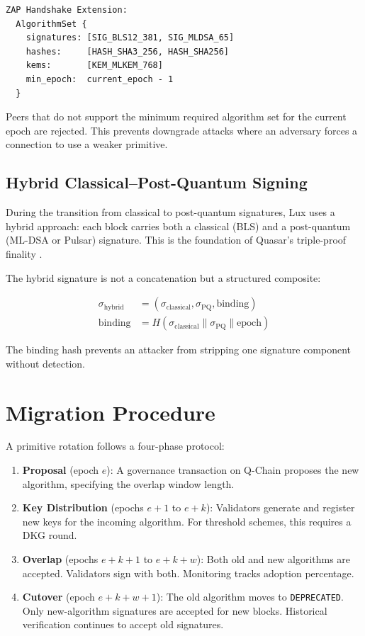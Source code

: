 \documentclass[11pt]{article}
\begin{document}
\begin{verbatim}
ZAP Handshake Extension:
  AlgorithmSet {
    signatures: [SIG_BLS12_381, SIG_MLDSA_65]
    hashes:     [HASH_SHA3_256, HASH_SHA256]
    kems:       [KEM_MLKEM_768]
    min_epoch:  current_epoch - 1
  }
\end{verbatim}

Peers that do not support the minimum required algorithm set for the current epoch are rejected. This prevents downgrade attacks where an adversary forces a connection to use a weaker primitive.

\subsection{Hybrid Classical--Post-Quantum Signing}

During the transition from classical to post-quantum signatures, Lux uses a hybrid approach: each block carries both a classical (BLS) and a post-quantum (ML-DSA or Pulsar) signature. This is the foundation of Quasar's triple-proof finality \cite{quasar}.

The hybrid signature is not a concatenation but a structured composite:

\begin{align}
\sigma_{\text{hybrid}} &= (\sigma_{\text{classical}}, \sigma_{\text{PQ}}, \text{binding}) \\
\text{binding} &= H(\sigma_{\text{classical}} \| \sigma_{\text{PQ}} \| \text{epoch})
\end{align}

The binding hash prevents an attacker from stripping one signature component without detection.

\section{Migration Procedure}

A primitive rotation follows a four-phase protocol:

\begin{enumerate}
\item \textbf{Proposal} (epoch $e$): A governance transaction on Q-Chain proposes the new algorithm, specifying the overlap window length.
\item \textbf{Key Distribution} (epochs $e+1$ to $e+k$): Validators generate and register new keys for the incoming algorithm. For threshold schemes, this requires a DKG round.
\item \textbf{Overlap} (epochs $e+k+1$ to $e+k+w$): Both old and new algorithms are accepted. Validators sign with both. Monitoring tracks adoption percentage.
\item \textbf{Cutover} (epoch $e+k+w+1$): The old algorithm moves to \texttt{DEPRECATED}. Only new-algorithm signatures are accepted for new blocks. Historical verification continues to accept old signatures.
\end{enumerate}
\end{document}
